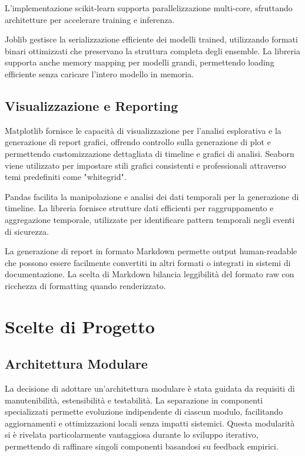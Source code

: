 \documentclass[12pt,a4paper]{report}
\theoremstyle{definition}
\begin{document}
L'implementazione scikit-learn supporta parallelizzazione multi-core, sfruttando architetture per accelerare training e inferenza. 

Joblib gestisce la serializzazione efficiente dei modelli trained, utilizzando formati binari ottimizzati che preservano la struttura completa degli ensemble. La libreria supporta anche memory mapping per modelli grandi, permettendo loading efficiente senza caricare l'intero modello in memoria.

\section{Visualizzazione e Reporting}

Matplotlib fornisce le capacità di visualizzazione per l'analisi esplorativa e la generazione di report grafici, offrendo controllo sulla generazione di plot e permettendo customizzazione dettagliata di timeline e grafici di analisi. Seaborn viene utilizzato per impostare stili grafici consistenti e professionali attraverso temi predefiniti come "whitegrid".

Pandas facilita la manipolazione e analisi dei dati temporali per la generazione di timeline. La libreria fornisce strutture dati efficienti per raggruppamento e aggregazione temporale, utilizzate per identificare pattern temporali negli eventi di sicurezza.

La generazione di report in formato Markdown permette output human-readable che possono essere facilmente convertiti in altri formati o integrati in sistemi di documentazione. La scelta di Markdown bilancia leggibilità del formato raw con ricchezza di formatting quando renderizzato.

\chapter{Scelte di Progetto}

\section{Architettura Modulare}

La decisione di adottare un'architettura modulare è stata guidata da requisiti di manutenibilità, estensibilità e testabilità. La separazione in componenti specializzati permette evoluzione indipendente di ciascun modulo, facilitando aggiornamenti e ottimizzazioni locali senza impatti sistemici. Questa modularità si è rivelata particolarmente vantaggiosa durante lo sviluppo iterativo, permettendo di raffinare singoli componenti basandosi su feedback empirici.
\end{document}
